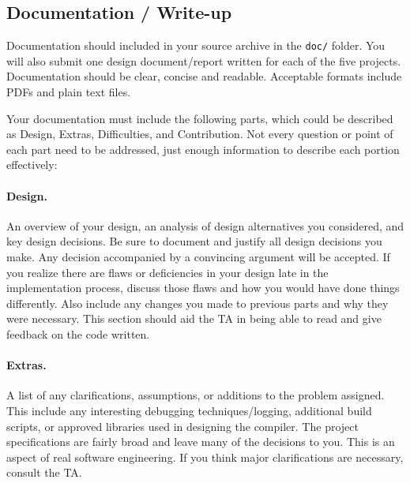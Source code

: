 \documentclass[11pt]{article}
\begin{document}
\subsection{Documentation / Write-up}

Documentation should included in your source archive in the {\tt doc/} folder.
You will also submit one design document/report written for each of the five projects.
Documentation should be clear, concise and readable.
Acceptable formats include PDFs and plain text files.

Your documentation must include the following parts, which could be described as Design, Extras, Difficulties, and Contribution.
Not every question or point of each part need to be addressed, just enough information to describe each portion effectively:

\paragraph{Design.}
An overview of your design, an analysis of design alternatives you considered, and key design decisions.
Be sure to document and justify all design decisions you make.
Any decision accompanied by a convincing argument will be accepted.
If you realize there are flaws or deficiencies in your design late in the implementation process, discuss those flaws and how you would have done things differently.
Also include any changes you made to previous parts and why they were necessary.
This section should aid the TA in being able to read and give feedback on the code written.

\paragraph{Extras.}
A list of any clarifications, assumptions, or additions to the problem assigned.
This include any interesting debugging techniques/logging, additional build scripts, or approved libraries used in designing the compiler.
The project specifications are fairly broad and leave many of the decisions to you.
This is an aspect of real software engineering.
If you think major clarifications are necessary, consult the TA.
\end{document}
